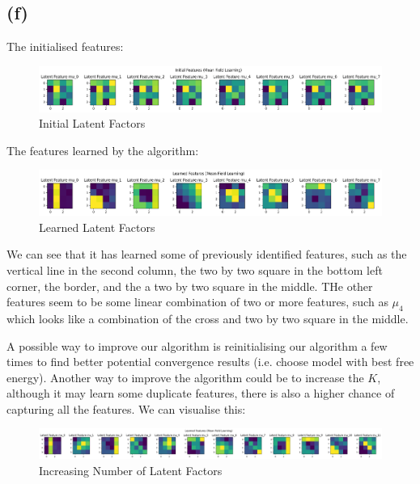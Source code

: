 \documentclass[12pt]{article}
\begin{document}
\subsection*{(f)}

The initialised features:

\begin{figure}[h]
\centering
\includegraphics[scale=0.4]{outputs/q3/f-init-latent-factors}
\caption{Initial Latent Factors}
\label{fig:3f-init-latent-factors}
\end{figure}

The features learned by the algorithm:

\begin{figure}[h]
\centering
\includegraphics[scale=0.4]{outputs/q3/f-latent-factors}
\caption{Learned Latent Factors}
\label{fig:3f-latent-factors}
\end{figure}

We can see that it has learned some of previously identified features, such as the vertical line in the second column, the two by two square in the bottom left corner, the border, and the a two by two square in the middle. THe other features seem to be some linear combination of two or more features, such as $\mu_4$ which looks like a combination of the cross and two by two square in the middle.

A possible way to improve our algorithm is reinitialising our algorithm a few times to find better potential convergence results (i.e. choose model with best free energy).
Another way to improve the algorithm could be to increase the $K$, although it may learn some duplicate features, there is also a higher chance of capturing all the features. We can visualise this:

\begin{figure}[h]
\centering
\includegraphics[scale=0.25]{outputs/q3/f-larger-k-latent-factors}
\caption{Increasing Number of Latent Factors}
\label{fig:3f-larger-k-latent-factors}
\end{figure}
\end{document}
